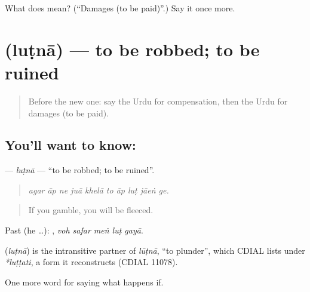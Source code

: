 \begin{tcolorbox}[breakable,colback=teal!4,colframe=teal!35!black,title={Before you move on}]
What does  mean? (\textquotedblleft{}Damages (to be paid)\textquotedblright{}.) Say it once more.
\end{tcolorbox}
\section[\texorpdfstring{\ur{لٹنا} (luṭnā)}{لٹنا (luṭnā)}]{ (luṭnā) — to be robbed; to be ruined}

\label{lesson:UR-C540-lutna}



\begin{quote}
Before the new one: say the Urdu for compensation, then the Urdu for damages (to be paid).
\end{quote}

\subsection*{You'll want to know: }
\textbf{} — \emph{luṭnā} — \textquotedblleft{}to be robbed; to be ruined\textquotedblright{}.

\begin{quote}
         
\end{quote}

\begin{quote}
\emph{agar āp ne juā khelā to āp luṭ jāeṅ ge.}
\end{quote}

\begin{quote}
If you gamble, you will be fleeced.
\end{quote}

Past (he …):     , \emph{voh safar meṅ luṭ gayā}.

\begin{cousinweb}
\textbf{} (\emph{luṭnā}) is the intransitive partner of \emph{lūṭnā}, \textquotedblleft{}to plunder\textquotedblright{}, which CDIAL lists under \emph{*luṭṭati}, a form it reconstructs (CDIAL 11078).
\end{cousinweb}

\begin{grammarlens}[title={What you've built}]
One more word for saying what happens if.
\end{grammarlens}

